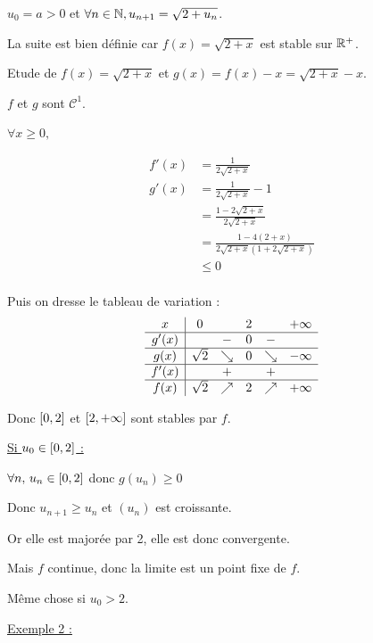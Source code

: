 \begin{exemple}
    $u_0 = a > 0$ et $\forall n \in \mathbb{N}, u_{n + 1} = \sqrt{2 + u_n}$. 

    La suite est bien définie car $f(x) = \sqrt{2 + x}$ est stable sur $\mathbb{R}^+$. 

    Etude de $f(x) = \sqrt{2 + x}$ et $g(x)= f(x) - x = \sqrt{2 + x} - x$.

    $f$ et $g$ sont $\mathscr C^1$. 
    
    $\forall x  \geqslant 0,$

    \begin{align*}
        f'(x) & = \frac 1 {2\sqrt{2 + x}} \\
        g'(x) & = \frac 1 {2\sqrt{2 + x}} - 1 \\
        & = \frac{1 - 2 \sqrt{2 + x}}{2 \sqrt{2 + x}} \\
        & = \frac{1 - 4(2 + x)}{2 \sqrt{2 + x}(1 + 2\sqrt{2 + x})} \\
        & \leqslant 0 \\
    \end{align*}
    

    Puis on dresse le tableau de variation :
    \[\begin{array}{c|ccccc}
        x & 0 & & 2 & & +\infty \\
        \hline
        g'(x) & & - & 0 & - & \\
        \hline
        g(x) & \sqrt 2 & \searrow & 0 & \searrow & -\infty \\
        \hline
        f'(x) & \space & + & \space & + & \space \\
        \hline
        f(x) & \sqrt 2 & \nearrow & 2 & \nearrow & +\infty \\
    \end{array}\]

    Donc $\left[0, 2\right]$ et $\left[2, +\infty\right]$ sont stables par $f$.

    \avspace \qquad \uline{Si $u_0 \in \left[0, 2\right]$ :}

    \avspace $\forall n, \, u_n \in \left[0, 2\right]$ donc $g(u_n) \geqslant 0$ 

    Donc $u_{n + 1} \geqslant u_n$ et $(u_n)$ est croissante. 

    Or elle est majorée par 2, elle est donc convergente. 

    Mais $f$ continue, donc la limite est un point fixe de $f$.

    Même chose si $u_0 > 2$. 

    \lvspace \lvspace
    \uline{Exemple 2 :}
    

\end{exemple}

